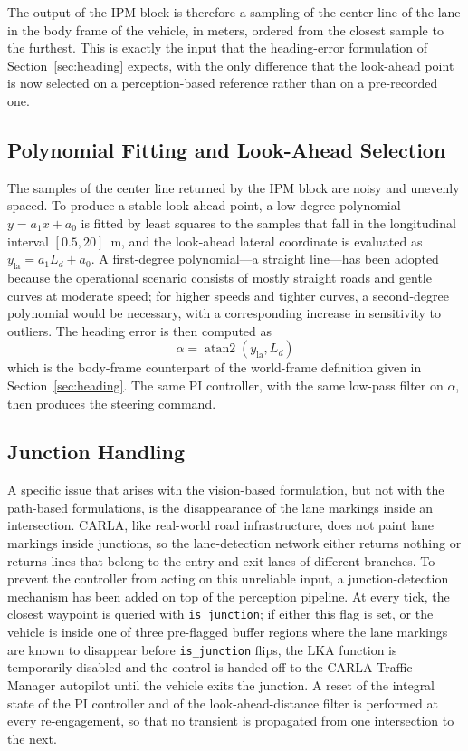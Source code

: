 The output of the \acs{IPM} block is therefore a sampling of the center line of the lane in the body frame of the vehicle, in meters, ordered from the closest sample to the furthest. This is exactly the input that the heading-error formulation of Section~\ref{sec:heading} expects, with the only difference that the look-ahead point is now selected on a perception-based reference rather than on a pre-recorded one.

\subsection{Polynomial Fitting and Look-Ahead Selection}
The samples of the center line returned by the \acs{IPM} block are noisy and unevenly spaced. To produce a stable look-ahead point, a low-degree polynomial $y = a_1 x + a_0$ is fitted by least squares to the samples that fall in the longitudinal interval $[0.5, 20]$~m, and the look-ahead lateral coordinate is evaluated as $y_{\mathrm{la}} = a_1 L_d + a_0$. A first-degree polynomial---a straight line---has been adopted because the operational scenario consists of mostly straight roads and gentle curves at moderate speed; for higher speeds and tighter curves, a second-degree polynomial would be necessary, with a corresponding increase in sensitivity to outliers. The heading error is then computed as
\begin{equation}
    \alpha = \operatorname{atan2}(y_{\mathrm{la}}, L_d)
\end{equation}
which is the body-frame counterpart of the world-frame definition given in Section~\ref{sec:heading}. The same PI controller, with the same low-pass filter on $\alpha$, then produces the steering command.

\subsection{Junction Handling}
A specific issue that arises with the vision-based formulation, but not with the path-based formulations, is the disappearance of the lane markings inside an intersection. CARLA, like real-world road infrastructure, does not paint lane markings inside junctions, so the lane-detection network either returns nothing or returns lines that belong to the entry and exit lanes of different branches. To prevent the controller from acting on this unreliable input, a junction-detection mechanism has been added on top of the perception pipeline. At every tick, the closest waypoint is queried with \texttt{is\_junction}; if either this flag is set, or the vehicle is inside one of three pre-flagged buffer regions where the lane markings are known to disappear before \texttt{is\_junction} flips, the \ac{LKA} function is temporarily disabled and the control is handed off to the CARLA Traffic Manager autopilot until the vehicle exits the junction. A reset of the integral state of the PI controller and of the look-ahead-distance filter is performed at every re-engagement, so that no transient is propagated from one intersection to the next.

